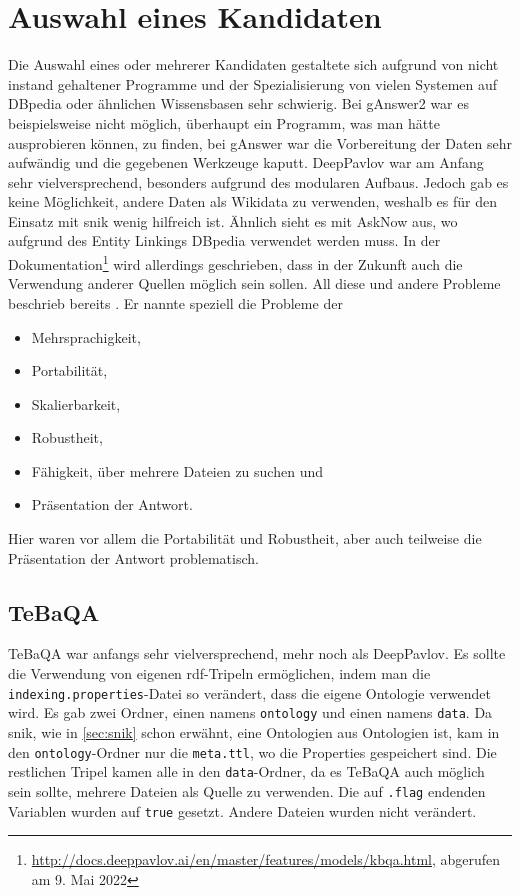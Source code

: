 
\section{Auswahl eines Kandidaten}

Die Auswahl eines oder mehrerer Kandidaten gestaltete sich aufgrund von nicht instand gehaltener Programme
und der Spezialisierung von vielen Systemen auf DBpedia oder ähnlichen Wissensbasen sehr schwierig.
Bei gAnswer2 war es beispielsweise nicht möglich, überhaupt ein Programm, was man hätte ausprobieren können, zu finden,
bei gAnswer war die Vorbereitung der Daten sehr aufwändig und die gegebenen Werkzeuge kaputt.
DeepPavlov war am Anfang sehr vielversprechend, besonders aufgrund des modularen Aufbaus.
Jedoch gab es keine Möglichkeit, andere Daten als Wikidata zu verwenden, weshalb es für den Einsatz mit \ac{snik} wenig hilfreich ist.
Ähnlich sieht es mit AskNow aus, wo aufgrund des Entity Linkings DBpedia verwendet werden muss.
In der Dokumentation\footnote{\url{http://docs.deeppavlov.ai/en/master/features/models/kbqa.html}, abgerufen am 9. Mai 2022} wird allerdings geschrieben,
dass in der Zukunft auch die Verwendung anderer Quellen möglich sein sollen.
All diese und andere Probleme beschrieb bereits \citet{diefenbachkbqa}.
Er nannte speziell die Probleme der
\begin{itemize}
  \item Mehrsprachigkeit,
  \item Portabilität,
  \item Skalierbarkeit,
  \item Robustheit,
  \item Fähigkeit, über mehrere Dateien zu suchen und
  \item Präsentation der Antwort.
\end{itemize}
Hier waren vor allem die Portabilität und Robustheit, aber auch teilweise die Präsentation der Antwort problematisch.

\subsection{TeBaQA}

TeBaQA war anfangs sehr vielversprechend, mehr noch als DeepPavlov.
Es sollte die Verwendung von eigenen \ac{rdf}-Tripeln ermöglichen, indem man die \texttt{indexing.properties}-Datei so verändert, dass die eigene Ontologie verwendet wird.
Es gab zwei Ordner, einen namens \texttt{ontology} und einen namens \texttt{data}.
Da \ac{snik}, wie in \cref{sec:snik} schon erwähnt, eine Ontologien aus Ontologien ist, kam in den \texttt{ontology}-Ordner nur die \texttt{meta.ttl}, wo die Properties gespeichert sind.
Die restlichen Tripel kamen alle in den \texttt{data}-Ordner, da es TeBaQA auch möglich sein sollte, mehrere Dateien als Quelle zu verwenden.
Die auf \texttt{.flag} endenden Variablen wurden auf \texttt{true} gesetzt.
Andere Dateien wurden nicht verändert.

